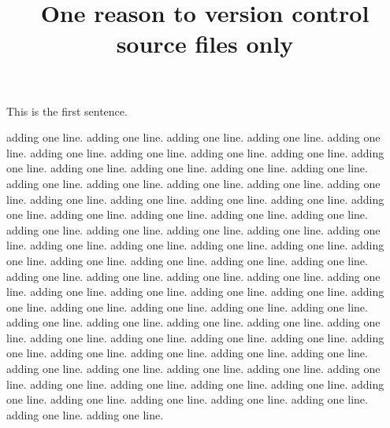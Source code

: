 \documentclass{article}
\title{One reason to version control source files only}
\begin{document}
\maketitle

This is the first sentence.

adding one line.
adding one line.
adding one line.
adding one line.
adding one line.
adding one line.
adding one line.
adding one line.
adding one line.
adding one line.
adding one line.
adding one line.
adding one line.
adding one line.
adding one line.
adding one line.
adding one line.
adding one line.
adding one line.
adding one line.
adding one line.
adding one line.
adding one line.
adding one line.
adding one line.
adding one line.
adding one line.
adding one line.
adding one line.
adding one line.
adding one line.
adding one line.
adding one line.
adding one line.
adding one line.
adding one line.
adding one line.
adding one line.
adding one line.
adding one line.
adding one line.
adding one line.
adding one line.
adding one line.
adding one line.
adding one line.
adding one line.
adding one line.
adding one line.
adding one line.
adding one line.
adding one line.
adding one line.
adding one line.
adding one line.
adding one line.
adding one line.
adding one line.
adding one line.
adding one line.
adding one line.
adding one line.
adding one line.
adding one line.
adding one line.
adding one line.
adding one line.
adding one line.
adding one line.
adding one line.
adding one line.
adding one line.
adding one line.
adding one line.
adding one line.
adding one line.
adding one line.
adding one line.
adding one line.
adding one line.
adding one line.
adding one line.
adding one line.
adding one line.
adding one line.
adding one line.
\end{document}
